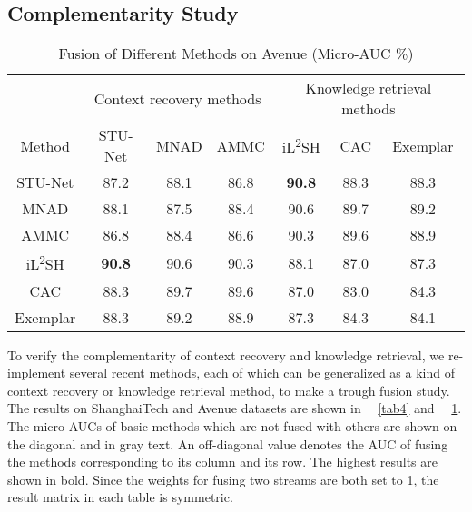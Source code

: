 \documentclass[lettersize,journal]{IEEEtran}
\begin{document}
\subsection{Complementarity Study}

\begin{table}[!t]
	\centering
	\caption{Fusion of Different Methods on Avenue (Micro-AUC \%)}
	\label{tab5}
	\setlength\tabcolsep{4.6pt}
	\begin{tabular}{c|ccc|ccc}
		\hline
		& \multicolumn{3}{c|}{Context recovery methods} & \multicolumn{3}{c}{Knowledge retrieval methods} \\ \cline{2-7} 
		Method   & STU-Net        & MNAD          & AMMC          & iL\textsuperscript{2}SH           & CAC            & Exemplar       \\ \hline
		STU-Net  & \textcolor[rgb]{0.5,0.5,0.5}{87.2}  & 88.1          & 86.8          & \textbf{90.8}            & 88.3           & 88.3           \\
		MNAD     & 88.1           & \textcolor[rgb]{0.5,0.5,0.5}{87.5} & 88.4          & 90.6            & 89.7           & 89.2           \\
		AMMC     & 86.8           & 88.4          & \textcolor[rgb]{0.5,0.5,0.5}{86.6} & 90.3            & 89.6           & 88.9           \\ \hline
		iL\textsuperscript{2}SH    & \textbf{90.8}           & 90.6          & 90.3          & \textcolor[rgb]{0.5,0.5,0.5}{88.1}   & 87.0           & 87.3           \\
		CAC      & 88.3           & 89.7          & 89.6          & 87.0            & \textcolor[rgb]{0.5,0.5,0.5}{83.0}  & 84.3           \\
		Exemplar & 88.3           & 89.2          & 88.9          & 87.3            & 84.3           & \textcolor[rgb]{0.5,0.5,0.5}{84.1}  \\ \hline
	\end{tabular}
\end{table}

To verify the complementarity of context recovery and knowledge retrieval, we re-implement several recent methods, each of which can be generalized as a kind of context recovery or knowledge retrieval method, to make a trough fusion study.
The results on ShanghaiTech and Avenue datasets are shown in ~\tablename~\ref{tab4} and ~\tablename~\ref{tab5}.
The micro-AUCs of basic methods which are not fused with others are shown on the diagonal and in gray text.
An off-diagonal value denotes the AUC of fusing the methods corresponding to its column and its row.
The highest results are shown in bold.
Since the weights for fusing two streams are both set to 1, the result matrix in each table is symmetric.
\end{document}
